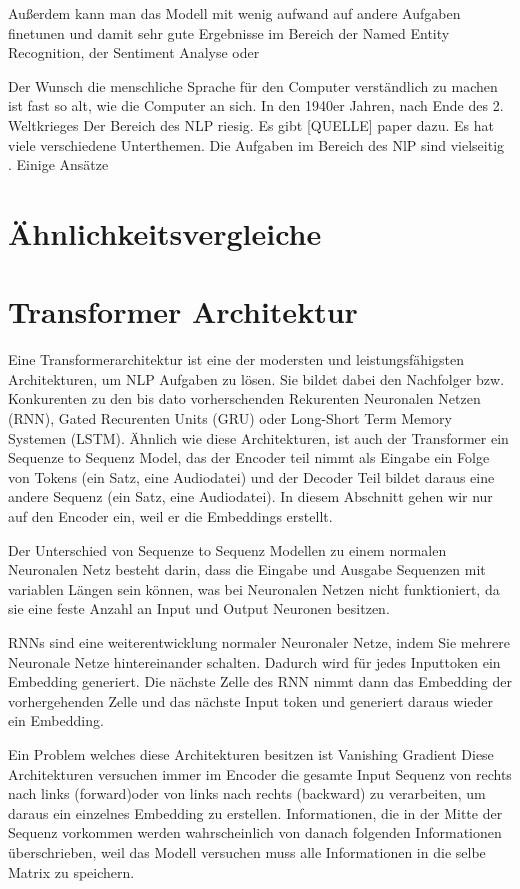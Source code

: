 Außerdem kann man das Modell mit wenig aufwand auf andere Aufgaben finetunen und damit sehr gute Ergebnisse im Bereich der Named Entity Recognition, der Sentiment Analyse oder  










Der Wunsch die menschliche Sprache für den Computer verständlich zu machen ist fast so alt, wie die Computer an sich. 
In den 1940er Jahren, nach Ende des 2. Weltkrieges 
Der Bereich des NLP riesig. 
Es gibt [QUELLE] paper dazu. 
Es hat viele verschiedene Unterthemen. 
Die Aufgaben im Bereich des NlP sind vielseitig . Einige Ansätze 

\section{Ähnlichkeitsvergleiche}
\section{Transformer Architektur}


Eine Transformerarchitektur ist eine der modersten und leistungsfähigsten Architekturen, um NLP Aufgaben zu lösen. 
Sie bildet dabei den Nachfolger bzw. Konkurenten zu den bis dato vorherschenden Rekurenten Neuronalen Netzen (RNN), Gated Recurenten Units (GRU) oder Long-Short Term Memory Systemen (LSTM). 
Ähnlich wie diese Architekturen, ist auch der Transformer ein Sequenze to Sequenz Model, das der Encoder teil nimmt als Eingabe ein Folge von Tokens (ein Satz, eine Audiodatei) und der Decoder Teil bildet daraus eine andere Sequenz (ein Satz, eine Audiodatei). 
In diesem Abschnitt gehen wir nur auf den Encoder ein, weil er die Embeddings erstellt.

Der Unterschied von Sequenze to Sequenz Modellen zu einem normalen Neuronalen Netz besteht darin, dass die Eingabe und Ausgabe Sequenzen mit variablen Längen sein können, was bei Neuronalen Netzen nicht funktioniert, da sie eine feste Anzahl an Input und Output Neuronen besitzen.

RNNs sind eine weiterentwicklung normaler Neuronaler Netze, indem Sie mehrere Neuronale Netze hintereinander schalten. 
Dadurch wird für jedes Inputtoken ein Embedding generiert. 
Die nächste Zelle des RNN nimmt dann das Embedding der vorhergehenden Zelle und das nächste Input token und generiert daraus wieder ein Embedding.

Ein Problem welches diese Architekturen besitzen ist Vanishing Gradient
Diese Architekturen versuchen immer im Encoder die gesamte Input Sequenz von rechts nach links (forward)oder von links nach rechts (backward) zu verarbeiten, um daraus ein einzelnes Embedding zu erstellen.
Informationen, die in der Mitte der Sequenz vorkommen werden wahrscheinlich von danach folgenden Informationen überschrieben, weil das Modell versuchen muss alle Informationen in die selbe Matrix zu speichern. 

